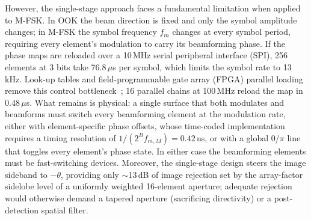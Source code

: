 \documentclass[journal]{IEEEtran}
\begin{document}
However, the single-stage approach faces a fundamental limitation when
applied to M-FSK. In OOK the beam direction is fixed and only the symbol
amplitude changes; in M-FSK the symbol frequency $f_m$ changes at every symbol
period, requiring every element's modulation to carry its beamforming phase. If the phase maps are reloaded over a 10\,MHz serial peripheral interface (SPI), 256 elements at 3 bits take 76.8\,$\mu$s per symbol, which limits the symbol rate to 13\,kHz. Look-up tables and field-programmable gate array (FPGA) parallel loading remove this control bottleneck~\cite{zhang2018space,zhao2019programmable,liaskos2022software}; 16 parallel chains at 100\,MHz reload the map in 0.48\,$\mu$s. What remains is physical: a single surface that both modulates and beamforms must switch every beamforming element at the modulation rate, either with element-specific phase offsets, whose time-coded implementation requires a timing resolution of $1/(2^B f_{m,M}) = 0.42$\,ns, or with a global 0/$\pi$ line that toggles every element's phase state. In either case the beamforming elements must be fast-switching devices.
 Moreover, the single-stage design steers the
image sideband to $-\theta$, providing only $\sim$13\,dB of image rejection
set by the array-factor sidelobe level of a uniformly weighted 16-element
aperture; adequate rejection would otherwise demand a tapered aperture
(sacrificing directivity) or a post-detection spatial filter.
\end{document}

